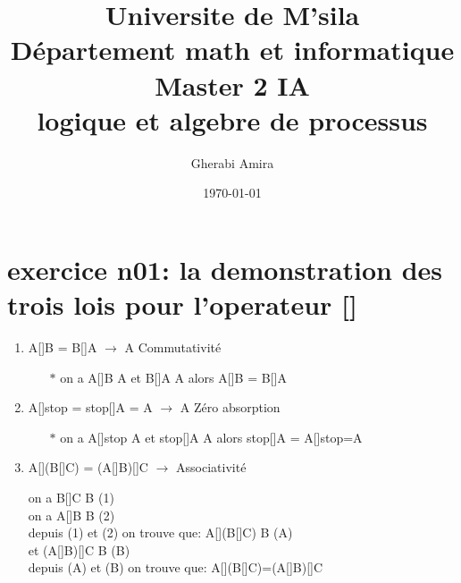 \documentclass[11pt, a4paper]{book}
\title{Universite de M'sila \\ Département math et informatique 
\\ Master 2 IA \\logique et algebre de processus}
\author{Gherabi Amira}
\date{\today}
\begin{document}
\maketitle
\section*{exercice n01: la demonstration des trois lois pour l'operateur []}
\begin{enumerate}
\item  A[]B = B[]A $\to$ A \:\:\:Commutativité 
\begin{enumerate}
    \item[$\ast$]  on a A[]B \: \:  A \: \: et \: \:  B[]A \:    \: A \:alors\: A[]B = B[]A
\end{enumerate} 
\item A[]stop = stop[]A = A $\to$\:\:\: A Zéro absorption
\begin{enumerate}
    \item[$\ast$]  on a A[]stop \: \:  A \: \: et \: \:  stop[]A \:    \: A \:alors\: stop[]A = A[]stop=A
\end{enumerate} 
\item  A[](B[]C) = (A[]B)[]C $\to$ \:\:\:Associativité 
\begin{enumerate}
  on \: a \:  B[]C \:    \: B \:        (1)\\
  on \: a \:  A[]B \:    \: B \:          (2)\\   
    depuis\: (1)\: et \:(2) \:on \:trouve\: que:\: A[](B[]C) \: \: B \: \:     \:\:\:\:    (A)    \\
    et (A[]B)[]C \: \: B \: \:    \:\:\:       (B) \\
   depuis\: (A) \:et \:(B) \:on \:trouve \:que:\: A[](B[]C)=(A[]B)[]C
\end{enumerate} 
    \end{enumerate}
\end{document}
